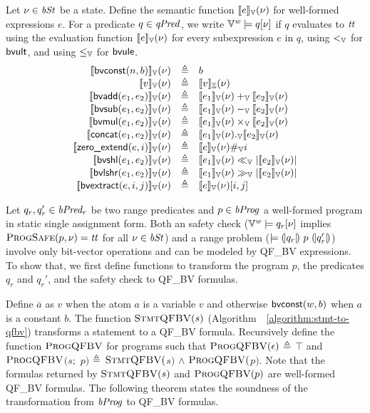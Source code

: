 Let $\nu \in \mathit{bSt}$ be a state.
Define the semantic function $[\![{e}]\!]_{\mathbb{V}}(\nu)$ for well-formed expressions $e$.
For a predicate $q \in \mathit{qPred}$, we write $\mathbb{V}^{\mathit{w}} \models q[\nu]$ if $q$ evaluates to $\mathit{tt}$ using the evaluation function $[\![{e}]\!]_{\mathbb{V}}(\nu)$ for every subexpression $e$ in $q$, using $<_{\mathbb{V}}$ for $\mbox{\textsf{bvult}}$, and using $\leq_{\mathbb{V}}$ for $\mbox{\textsf{bvule}}$.
\[
\begin{array}{rcl}
\bvvalueof{\bvconst(n, b)}(\bvst) & \defn & b \\
\bvvalueof{v}(\bvst) & \defn & \zvalueof{v}(\bvst) \\
\bvvalueof{\bvadd(e_1, e_2)}(\bvst) & \defn & \bvvalueof{e_1}(\bvst) +_\BV \bvvalueof{e_2}(\bvst) \\
\bvvalueof{\bvsub(e_1, e_2)}(\bvst) & \defn & \bvvalueof{e_1}(\bvst) -_\BV \bvvalueof{e_2}(\bvst) \\
\bvvalueof{\bvmul(e_1, e_2)}(\bvst) & \defn & \bvvalueof{e_1}(\bvst) \times_\BV \bvvalueof{e_2}(\bvst) \\
\bvvalueof{\bvconcat(e_1, e_2)}(\bvst) & \defn & \bvvalueof{e_1}(\bvst) ._\BV \bvvalueof{e_2}(\bvst) \\
\bvvalueof{\bvext(e, i)}(\bvst) & \defn & \bvvalueof{e}(\bvst) \#_\BV i \\
\bvvalueof{\bvshl(e_1, e_2)}(\bvst) & \defn & \bvvalueof{e_1}(\bvst) \ll_\BV |\bvvalueof{e_2}(\bvst)| \\
\bvvalueof{\bvlshr(e_1, e_2)}(\bvst) & \defn & \bvvalueof{e_1}(\bvst) \gg_\BV |\bvvalueof{e_2}(\bvst)| \\
\bvvalueof{\bvextract(e, i, j)}(\bvst) & \defn & \bvvalueof{e}(\bvst)[i, j] \\
\end{array}
\]

Let $q_r, q_r' \in \mathit{bPred_r}$ be two range predicates and $p \in \mathit{bProg}$ a well-formed program in static single assignment form.
Both an safety check ($\mathbb{V}^{\mathit{w}} \models q_r[\nu]$ implies $\textsc{ProgSafe}(p, \nu) = \mathit{tt}$ for all $\nu \in \mathit{bSt}$) and a range problem ($\models {(\!|}{q_r}{|\!)}~{p}~{(\!|}{q_r'}{|\!)}$) involve only bit-vector operations and can be modeled by QF\_BV expressions.
To show that, we first define functions to transform the program $p$, the predicates $q_r$ and $q_r'$, and the safety check to QF\_BV formulas.

Define $\overline{a}$ as $v$ when the atom $a$ is a variable $v$ and otherwise $\mbox{\textsf{bvconst}}(w, b)$ when $a$ is a constant $b$.
The function $\textsc{StmtQFBV}(s)$ (Algorithm~~\ref{algorithm:stmt-to-qfbv}) transforms a statement to a QF\_BV formula.
Recursively define the function $\textsc{ProgQFBV}$ for programs such that $\textsc{ProgQFBV}(\epsilon)$ $\triangleq$ $\top$ and $\textsc{ProgQFBV}$$(s;$ $p)$ $\triangleq$ $\textsc{StmtQFBV}($$s)$ $\land$ $\textsc{ProgQFBV}($$p)$.
Note that the formulas returned by $\textsc{StmtQFBV}(s)$ and $\textsc{ProgQFBV}(p)$ are well-formed QF\_BV formulas.
The following theorem states the soundness of the transformation from $\mathit{bProg}$ to QF\_BV formulas.

